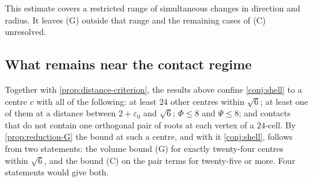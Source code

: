 \documentclass[11pt,reqno]{amsart}
\renewcommand{\_}{\origunderscore\allowbreak}
\numberwithin{equation}{section}
\theoremstyle{plain}
\theoremstyle{definition}
\theoremstyle{remark}
\begin{document}
This estimate covers a restricted range of simultaneous changes in
direction and radius. It leaves (G) outside that range and the
remaining cases of (C) unresolved.

\subsection{What remains near the contact regime}\label{sec:remains}

Together with \cref{prop:distance-criterion}, the results above confine
\cref{conj:shell} to a centre $c$ with all of the following: at least
$24$ other centres within $\sqrt6$; at least one of them at a distance
between $2+\varepsilon_0$ and $\sqrt6$; $\Phi\le8$ and $\Psi\le8$; and
contacts that do not contain one orthogonal pair of roots at each vertex
of a $24$-cell. By \cref{prop:reduction-G} the bound at such a centre, and
with it \cref{conj:shell}, follows from two statements: the volume bound
(G) for exactly twenty-four centres within $\sqrt6$, and the bound (C) on
the pair terms for twenty-five or more. Four statements would give both.
\end{document}
